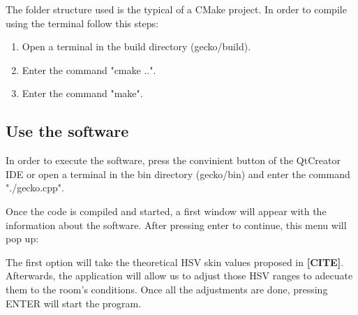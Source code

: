 \documentclass{article}
\begin{document}
The folder structure used is the typical of a CMake project. In order to compile using the terminal follow this steps: 
\begin{enumerate}
 \item Open a terminal in the build directory (gecko/build). 
 \item Enter the command "cmake ..". 
 \item Enter the command "make". 
\end{enumerate}

\subsection{Use the software}
In order to execute the software, press the convinient button of the QtCreator IDE or open a terminal in the bin directory (gecko/bin) and enter the command "./gecko.cpp". 

Once the code is compiled and started, a first window will appear with the information about the software. After pressing enter to continue, this menu will pop up: 
\begin{center}
\end{center}

\vspace{1cm}
The first option will take the theoretical HSV skin values proposed in \textbf{[CITE]}. Afterwards, the application will allow us to adjust those HSV ranges to adecuate them to the room's conditions. 
Once all the adjustments are done, pressing ENTER will start the program. 
\end{document}
